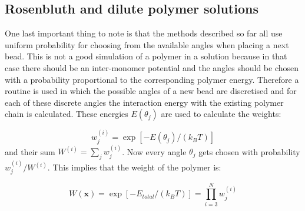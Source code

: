 \subsection*{Rosenbluth and dilute polymer solutions}
One last important thing to note is that the methods described so far all use uniform probability for choosing from the available angles when placing a next bead. This is not a good simulation of a polymer in a solution because in that case there should be an inter-monomer potential and the angles should be chosen with a probability proportional to the corresponding polymer energy.
Therefore a routine is used in which the possible angles of a new bead are discretised and for each of these discrete angles the interaction energy with the existing polymer chain is calculated. These energies $E\!\left(\theta_j\right)$ are used to calculate the weights:

\begin{equation}
	w_j^{(i)} = \exp [-E\left(\theta_j\right) / \left( k_B T \right)]
\end{equation}
and their sum $W^{(i)} = \sum_j w_j^{(i)}$. Now every angle $\theta_j$ gets chosen with probability $w_j^{(i)}/W^{(i)}$. This implies that the weight of the polymer is:

\begin{equation}
	W\!(\mathbf{x}) = \exp\left[-E_{total}/ \left( k_B T \right) \right] = \prod_{i=3}^{N} w_j^{(i)}
\end{equation}